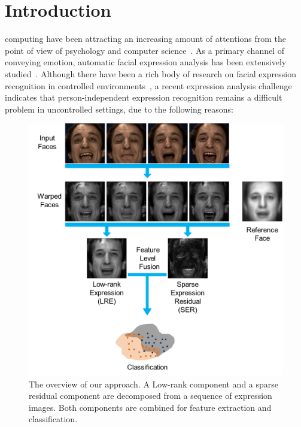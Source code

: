 \documentclass[journal]{IEEEtran}
\begin{document}
%
\IEEEpeerreviewmaketitle



\section{Introduction}

 computing have been attracting an increasing amount of attentions from the point of view of psychology and computer science~\cite{Picard03}. As a primary channel of conveying emotion, automatic facial expression analysis has been extensively studied~\cite{Pantic_PAMI00}\cite{Torre11}. Although there have been a rich body of research on facial expression recognition in controlled environments~\cite{Torre11}, a recent expression analysis challenge~\cite{FERA11} indicates that person-independent expression recognition remains a difficult problem in uncontrolled settings, due to the following reasons:

\begin{figure}[htbp]
	\centering
		\includegraphics[width=.95\columnwidth]{pics/splash.png}
	\caption{The overview of our approach. A Low-rank component and a sparse residual component are decomposed from a sequence of expression images. Both components are combined for feature extraction and classification.}
	\label{fig:splash}
\end{figure}
\end{document}
